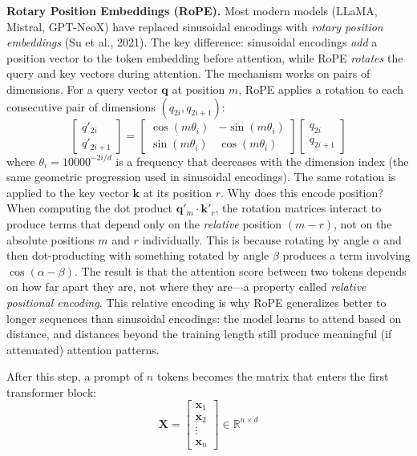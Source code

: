 \begin{notebox}
\textbf{Rotary Position Embeddings (RoPE).} Most modern models (LLaMA, Mistral, GPT-NeoX) have replaced sinusoidal encodings with \emph{rotary position embeddings} (Su et al., 2021). The key difference: sinusoidal encodings \emph{add} a position vector to the token embedding before attention, while RoPE \emph{rotates} the query and key vectors during attention. The mechanism works on pairs of dimensions. For a query vector $\mathbf{q}$ at position $m$, RoPE applies a rotation to each consecutive pair of dimensions $(q_{2i}, q_{2i+1})$:
\[
\begin{bmatrix} q'_{2i} \\ q'_{2i+1} \end{bmatrix}
= \begin{bmatrix} \cos(m\theta_i) & -\sin(m\theta_i) \\ \sin(m\theta_i) & \cos(m\theta_i) \end{bmatrix}
\begin{bmatrix} q_{2i} \\ q_{2i+1} \end{bmatrix}
\]
where $\theta_i = 10000^{-2i/d}$ is a frequency that decreases with the dimension index (the same geometric progression used in sinusoidal encodings). The same rotation is applied to the key vector $\mathbf{k}$ at its position $r$.
Why does this encode position? When computing the dot product $\mathbf{q}'_m \cdot \mathbf{k}'_r$, the rotation matrices interact to produce terms that depend only on the \emph{relative} position $(m - r)$, not on the absolute positions $m$ and $r$ individually. This is because rotating by angle $\alpha$ and then dot-producting with something rotated by angle $\beta$ produces a term involving $\cos(\alpha - \beta)$. The result is that the attention score between two tokens depends on how far apart they are, not where they are---a property called \emph{relative positional encoding}. This relative encoding is why RoPE generalizes better to longer sequences than sinusoidal encodings: the model learns to attend based on distance, and distances beyond the training length still produce meaningful (if attenuated) attention patterns.
\end{notebox}

After this step, a prompt of $n$ tokens becomes the matrix that enters the first transformer block:
\begin{equation}
\mathbf{X} = \begin{bmatrix} \mathbf{x}_1 \\ \mathbf{x}_2 \\ \vdots \\ \mathbf{x}_n \end{bmatrix} \in \mathbb{R}^{n \times d}
\end{equation}

